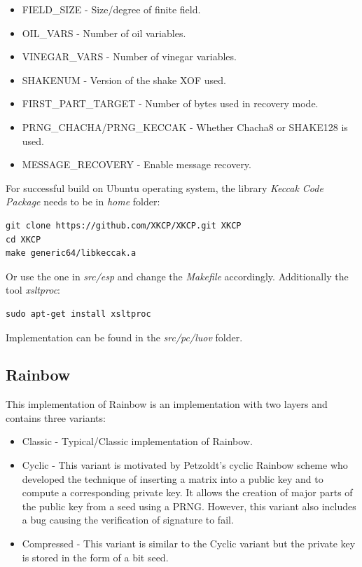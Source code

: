 \documentclass[thesis=M,english]{FITthesis}[2019/12/23]
\begin{document}
\begin{itemize}
\item	FIELD\_SIZE - Size/degree of finite field.
\item	OIL\_VARS - Number of oil variables.
\item	VINEGAR\_VARS - Number of vinegar variables.
\item	SHAKENUM - Version of the shake XOF used.
\item	FIRST\_PART\_TARGET - Number of bytes used in recovery mode.
\item	PRNG\_CHACHA/PRNG\_KECCAK - Whether Chacha8 or SHAKE128 is used.
\item	MESSAGE\_RECOVERY - Enable message recovery.
\end{itemize}

For successful build on Ubuntu operating system, the library \textit{Keccak Code Package} needs to be in \textit{home} folder:
\begin{lstlisting}[frame=single]
git clone https://github.com/XKCP/XKCP.git XKCP
cd XKCP
make generic64/libkeccak.a
\end{lstlisting}
Or use the one in \textit{src/esp} and change the \textit{Makefile} accordingly. Additionally the tool \textit{xsltproc}:
\begin{lstlisting}[frame=single]
sudo apt-get install xsltproc
\end{lstlisting}

\bigskip
\noindent
Implementation can be found in the \textit{src/pc/luov} folder.

\subsection{Rainbow}
This implementation of Rainbow is an implementation with two layers and contains three variants:
\begin{itemize}
\item	Classic - Typical/Classic implementation of Rainbow.
\item	Cyclic - This variant is motivated by Petzoldt's cyclic Rainbow scheme\cite{L-RB-CYC} who developed the technique of inserting a matrix into a public key and to compute a corresponding private key. It allows the creation of major parts of the public key from a seed using a PRNG. However, this variant also includes a bug causing the verification of signature to fail. 
\item	Compressed - This variant is similar to the Cyclic variant but the private key is stored in the form of a bit seed.
\end{itemize}
\end{document}
